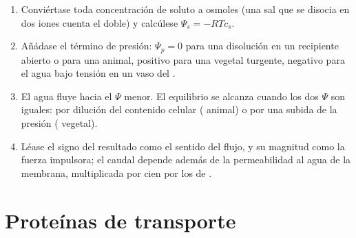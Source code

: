 \begin{method}\label{met:b1:membranes-transport:psi}
\begin{enumerate}
  \item Conviértase toda concentración de soluto a osmoles (una sal que se
        disocia en dos iones cuenta el doble) y calcúlese
        $\Psi_s =
        -RTc_s$.
  \item Añádase el término de presión: $\Psi_p = 0$ para una disolución en
        un recipiente abierto o para una  animal, positivo para una
         vegetal turgente, negativo para el agua bajo tensión en un
        vaso del .
  \item El agua fluye hacia el $\Psi$ menor. El equilibrio se alcanza
        cuando los dos $\Psi$ son iguales: por dilución del contenido
        celular ( animal) o por una subida de la presión (
        vegetal).
  \item Léase el signo del resultado como el sentido del flujo, y su
        magnitud como la fuerza impulsora; el caudal depende además de la
        permeabilidad al agua de la membrana, multiplicada por cien por los
         de .
\end{enumerate}
\end{method}

\section{Proteínas de transporte}

